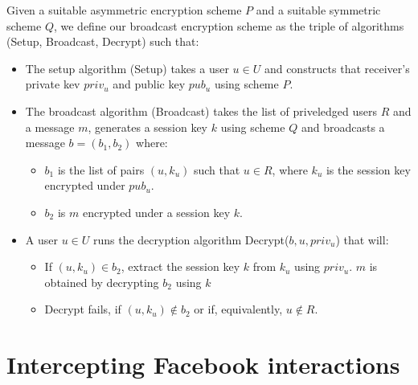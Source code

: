 \begin{defn}
    
    Given a suitable asymmetric encryption scheme $P$ and a suitable symmetric scheme $Q$, we define our broadcast encryption scheme as the triple of algorithms {\sc (Setup, Broadcast, Decrypt)} such that:
    
    \begin{itemize}
    
    \item The setup algorithm {\sc (Setup)} takes a user $u \in U$ and constructs that receiver's private kev $priv_u$ and public key $pub_u$ using scheme $P$.
    
    \item The broadcast algorithm {\sc (Broadcast)} takes the list of priveledged users $R$ and a message $m$, generates a session key $k$ using scheme $Q$ and broadcasts a message $b = (b_1,b_2)$ where:
    
    \begin{itemize}
        \item $b_1$ is the list of pairs $(u,k_u)$ such that $u \in R$, where $k_u$ is the session key encrypted under $pub_u$.
        \item $b_2$ is $m$ encrypted under a session key $k$.
    \end{itemize}
    
    
    \item A user $u \in U$ runs the decryption algorithm {\sc Decrypt($b, u, priv_u$)} that will:
    
        \begin{itemize}
            \item If $(u,k_u) \in b_2$, extract the session key $k$ from $k_u$ using $priv_u$. $m$ is obtained by decrypting $b_2$ using $k$
        
            \item {\sc Decrypt} fails, if $(u,k_u) \notin b_2$ or if, equivalently, $u \notin R$.
        
        \end{itemize}

    \end{itemize}
    

\end{defn}    


\FloatBarrier
\section{Intercepting Facebook interactions}

